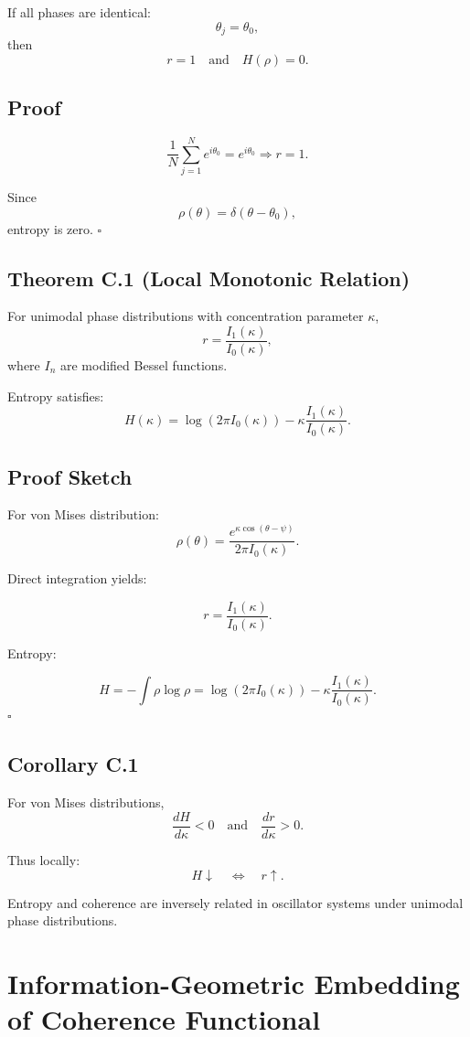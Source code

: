 \documentclass[12pt]{article}
\begin{document}
If all phases are identical:
\[
\theta_j = \theta_0,
\]
then
\[
r = 1
\quad \text{and} \quad
H(\rho) = 0.
\]

\subsection*{Proof}

\[
\frac{1}{N}\sum_{j=1}^N e^{i\theta_0}
= e^{i\theta_0}
\Rightarrow r = 1.
\]

Since
\[
\rho(\theta) = \delta(\theta - \theta_0),
\]
entropy is zero.
\hfill $\square$

\subsection*{Theorem C.1 (Local Monotonic Relation)}

For unimodal phase distributions with concentration parameter $\kappa$,
\[
r = \frac{I_1(\kappa)}{I_0(\kappa)},
\]
where $I_n$ are modified Bessel functions.

Entropy satisfies:
\[
H(\kappa)
=
\log(2\pi I_0(\kappa))
- \kappa \frac{I_1(\kappa)}{I_0(\kappa)}.
\]

\subsection*{Proof Sketch}

For von Mises distribution:
\[
\rho(\theta)
=
\frac{e^{\kappa \cos(\theta-\psi)}}{2\pi I_0(\kappa)}.
\]

Direct integration yields:

\[
r = \frac{I_1(\kappa)}{I_0(\kappa)}.
\]

Entropy:

\[
H
=
- \int \rho \log \rho
=
\log(2\pi I_0(\kappa))
- \kappa \frac{I_1(\kappa)}{I_0(\kappa)}.
\]
\hfill $\square$

\subsection*{Corollary C.1}

For von Mises distributions,
\[
\frac{dH}{d\kappa} < 0
\quad \text{and} \quad
\frac{dr}{d\kappa} > 0.
\]

Thus locally:
\[
H \downarrow
\quad \Leftrightarrow \quad
r \uparrow.
\]

Entropy and coherence are inversely related in oscillator systems under unimodal phase distributions.

\section{Information-Geometric Embedding of Coherence Functional}
\end{document}
